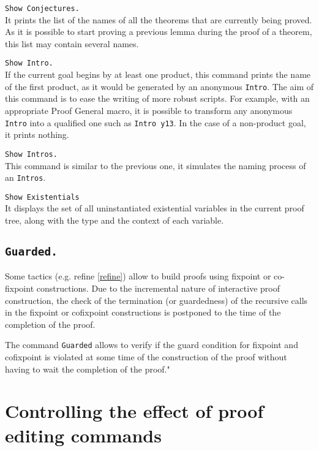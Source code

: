 \begin{Variants}
\item {\tt Show Conjectures.}\\
It prints the list of the names of all the theorems that 
are currently being proved.
As it is possible to start proving a previous lemma during
the proof of a theorem, this list may contain several 
names. 

\item{\tt Show Intro.}\\
If the current goal begins by at least one product, this command
prints the name of the first product, as it would be generated by 
an anonymous {\tt Intro}. The aim of this command is to ease the
writing of more robust scripts. For example, with an appropriate 
Proof General macro, it is possible to transform any anonymous {\tt
  Intro} into a qualified one such as {\tt Intro y13}.
In the case of a non-product goal, it prints nothing. 

\item{\tt Show Intros.}\\
This command is similar to the previous one, it simulates the naming 
process of an {\tt Intros}.

\item{\tt Show Existentials}\\ It displays
the set of all uninstantiated existential variables in the current proof tree, 
along with the type and the context of each variable.

\end{Variants}


\subsection[\tt Guarded.]{\tt Guarded.\label{Guarded}}

Some tactics (e.g. refine \ref{refine}) allow to build proofs using
fixpoint or co-fixpoint constructions. Due to the incremental nature
of interactive proof construction, the check of the termination (or
guardedness) of the recursive calls in the fixpoint or cofixpoint
constructions is postponed to the time of the completion of the proof.

The command \verb!Guarded! allows to verify if the guard condition for
fixpoint and cofixpoint is violated at some time of the construction
of the proof without having to wait the completion of the proof."


\section{Controlling the effect of proof editing commands}

